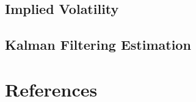 \documentclass{article}
\theoremstyle{definition}
\theoremstyle{remark}
\begin{document}
\subsection{Implied Volatility}






\subsection{Kalman Filtering Estimation}






\newpage
\section{References}
\end{document}
